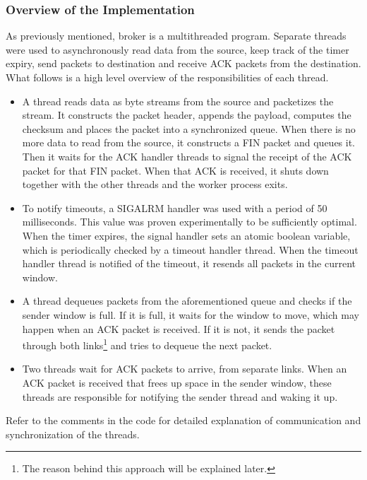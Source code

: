 \documentclass[conference]{IEEEtran}
\begin{document}
\subsubsection{Overview of the Implementation}
As previously mentioned, broker is a multithreaded program.
Separate threads were used to asynchronously read data from the source,
keep track of the timer expiry, send packets to destination and receive ACK packets from
the destination. What follows is a high level overview of the responsibilities of each thread.
\begin{itemize}
    \item
        A thread reads data as byte streams from the source and packetizes the stream.
        It constructs the packet header, appends the payload, computes the checksum and places
        the packet into a synchronized queue. When there is no more data to read
        from the source, it constructs a FIN packet and queues it. Then it
        waits for the ACK handler threads to signal the receipt of the ACK packet
        for that FIN packet. When that ACK is received, it shuts down together with
        the other threads and the worker process exits.
    \item
        To notify timeouts, a SIGALRM handler was used with a period of 50 milliseconds.
        This value was proven experimentally to be sufficiently optimal.
        When the timer expires, the signal handler sets an atomic boolean variable, which is periodically
        checked by a timeout handler thread. When the timeout handler thread is notified of the
        timeout, it resends all packets in the current window.
    \item
        A thread dequeues packets from the aforementioned queue and checks if the
        sender window is full. If it is full, it waits for the window to move, which may
        happen when an ACK packet is received. If it is not, it sends the packet
        through both links\footnote{The reason behind this approach will be explained later.}
        and tries to dequeue the next packet.
    \item
        Two threads wait for ACK packets to arrive, from separate links. When an ACK
        packet is received that frees up space in the sender window, these threads
        are responsible for notifying the sender thread and waking it up.
\end{itemize}
Refer to the comments in the code for detailed explanation of communication and
synchronization of the threads.
\end{document}
